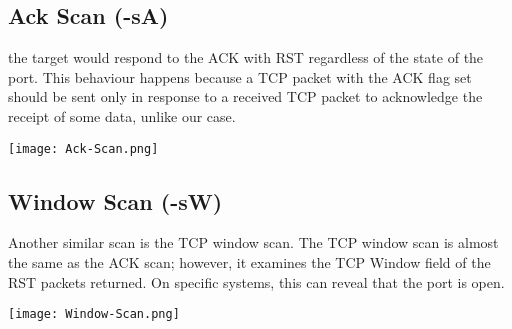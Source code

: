 \documentclass[11pt,a4paper]{article}
\begin{document}
\clearpage

\subsection{Ack Scan (-sA)}
the target would respond to the ACK with RST regardless of the state of the port. This behaviour happens because a TCP packet with the ACK flag set should be sent only in response to a received TCP packet to acknowledge the receipt of some data, unlike our case.

\begin{center}
  \texttt{[image: Ack-Scan.png]}
  \label{fig:Ack-Scan}
\end{center}

\subsection{Window Scan (-sW)}
Another similar scan is the TCP window scan. The TCP window scan is almost the same as the ACK scan; however, it examines the TCP Window field of the RST packets returned. On specific systems, this can reveal that the port is open.

\begin{center}
  \texttt{[image: Window-Scan.png]}
  \label{fig:Ack-Scan}
\end{center}
\end{document}
